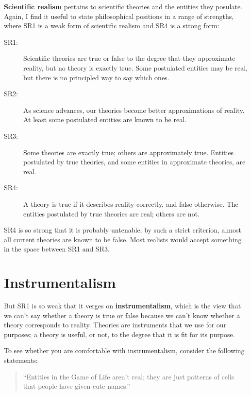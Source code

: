 \documentclass[10pt]{book}
\begin{document}
{\bf Scientific realism} pertains to scientific theories and the
entities they posulate.  Again, I find it useful to state
philosophical positions in a range of strengths, where SR1 is
a weak form of scientific realism and SR4 is a strong form:

\begin{description}

\item[SR1:] Scientific theories are true or false to the degree that
  they approximate reality, but no theory is exactly true.  Some
  postulated entities may be real, but there is no principled way to
  say which ones.

\item[SR2:] As science advances, our theories become better
  approximations of reality.  At least some postulated entities are
  known to be real.

\item[SR3:] Some theories are exactly true; others are approximately
  true.  Entities postulated by true theories, and some entities
  in approximate theories, are real.

\item[SR4:] A theory is true if it describes reality correctly, and
  false otherwise.  The entities postulated by true theories are real;
  others are not.

\end{description}

SR4 is so strong that it is probably untenable; by such a strict
criterion, almost all current theories are known to be false.  
Most realists would accept something in the space
between SR1 and SR3.


\section{Instrumentalism}

But SR1 is so weak that it verges on {\bf instrumentalism}, which is
the view that we can't say whether a theory is true or false because
we can't know whether a theory corresponds to reality.  Theories are
instruments that we use for our purposes; a theory is useful, or not,
to the degree that it is fit for its purpose.

To see whether you are comfortable with instrumentalism, consider
the following statements:

\begin{quote}
``Entities in the Game of Life aren't real; they are just patterns of
  cells that people have given cute names.''
\end{quote}
\end{document}
